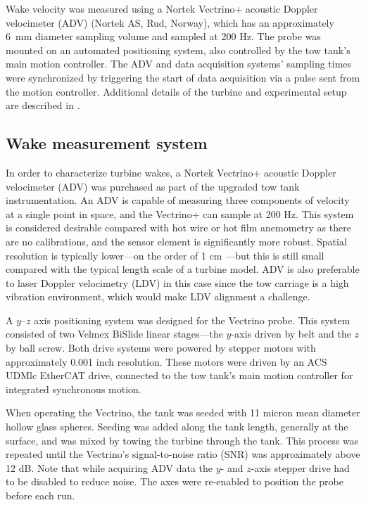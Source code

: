 Wake velocity was measured using a Nortek Vectrino+ acoustic Doppler velocimeter
(ADV) (Nortek AS, Rud, Norway), which has an approximately 6~mm diameter
sampling volume and sampled at 200 Hz. The probe was mounted on an automated
positioning system, also controlled by the tow tank's main motion controller.
The ADV and data acquisition systems' sampling times were synchronized by
triggering the start of data acquisition via a pulse sent from the motion
controller. Additional details of the turbine and experimental setup are
described in \cite{Bachant2015-JoT}.



\subsection{Wake measurement system}

In order to characterize turbine wakes, a Nortek Vectrino+ acoustic Doppler
velocimeter (ADV) was purchased as part of the upgraded tow tank
instrumentation. An ADV is capable of measuring three components of velocity at
a single point in space, and the Vectrino+ can sample at 200 Hz. This system is
considered desirable compared with hot wire or hot film anemometry as there are
no calibrations, and the sensor element is significantly more robust. Spatial
resolution is typically lower---on the order of 1 cm \cite{NortekVectrino}---but
this is still small compared with the typical length scale of a turbine model.
ADV is also preferable to laser Doppler velocimetry (LDV) in this case since the
tow carriage is a high vibration environment, which would make LDV alignment a
challenge.

A $y$--$z$ axis positioning system was designed for the Vectrino probe. This
system consisted of two Velmex BiSlide linear stages---the $y$-axis driven by
belt and the $z$ by ball screw. Both drive systems were powered by stepper
motors with approximately 0.001 inch resolution. These motors were driven by an
ACS UDMlc EtherCAT drive, connected to the tow tank's main motion controller for
integrated synchronous motion.

When operating the Vectrino, the tank was seeded with 11 micron mean diameter
hollow glass spheres. Seeding was added along the tank length, generally at the
surface, and was mixed by towing the turbine through the tank. This process was
repeated until the Vectrino's signal-to-noise ratio (SNR) was approximately
above 12 dB. Note that while acquiring ADV data the $y$- and $z$-axis stepper
drive had to be disabled to reduce noise. The axes were re-enabled to position
the probe before each run.


